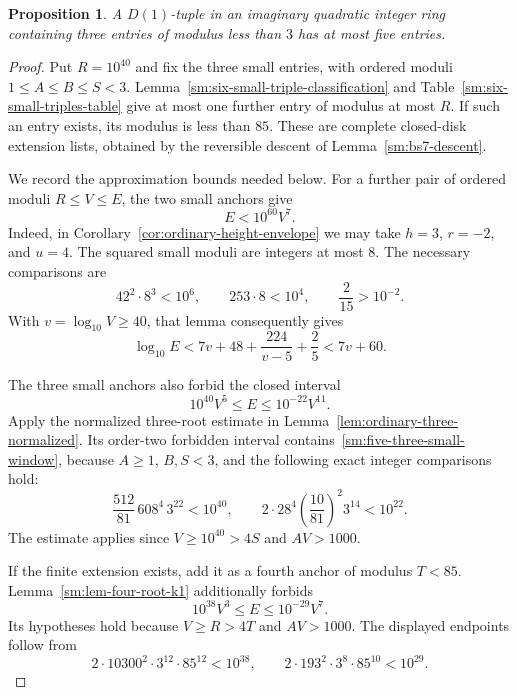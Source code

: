 \documentclass[12pt]{article}
\newtheorem{proposition}[theorem]{Proposition}
\numberwithin{equation}{section}
\begin{document}
\begin{proposition}\label{sm:five-three-small}
A $D(1)$-tuple in an imaginary quadratic integer ring containing
three entries of modulus less than $3$ has at most five entries.
\end{proposition}
\begin{proof}
Put $R=10^{40}$ and fix the three small entries, with ordered
moduli $1\le A\le B\le S<3$.
Lemma~\ref{sm:six-small-triple-classification} and
Table~\ref{sm:six-small-triples-table} give at most one further entry
of modulus at most $R$. If such an entry exists, its modulus is
less than $85$. These are complete closed-disk extension lists,
obtained by the reversible descent of Lemma~\ref{sm:bs7-descent}.

We record the approximation bounds needed below. For a further
pair of ordered moduli $R\le V\le E$, the two small anchors give
\begin{equation}\label{sm:five-small-upper}
 E<10^{60}V^7.
\end{equation}
Indeed, in Corollary~\ref{cor:ordinary-height-envelope} we may take
$h=3$, $r=-2$, and $u=4$. The squared small moduli are integers at most $8$. The necessary comparisons are
\[
 42^2\cdot8^3<10^6,\qquad 253\cdot8<10^4,\qquad
 \frac2{15}>10^{-2}.
\]
With $v=\log_{10}V\ge40$, that lemma consequently gives
\[
 \log_{10}E<7v+48+\frac{224}{v-5}+\frac25<7v+60.
\]

The three small anchors also forbid the closed interval
\begin{equation}\label{sm:five-three-small-window}
 10^{40}V^5\le E\le10^{-22}V^{11}.
\end{equation}
Apply the normalized three-root estimate
in Lemma~\ref{lem:ordinary-three-normalized}. Its order-two forbidden
interval contains~\eqref{sm:five-three-small-window}, because $A\ge1$,
$B,S<3$, and the following exact integer comparisons hold:
\[
 \frac{512}{81}\,608^4\,3^{22}<10^{40},\qquad
 2\cdot28^4\left(\frac{10}{81}\right)^2 3^{14}<10^{22}.
\]
The estimate applies since $V\ge10^{40}>4S$ and $AV>1000$.

If the finite extension exists, add it as a fourth anchor of
modulus $T<85$. Lemma~\ref{sm:lem-four-root-k1} additionally forbids
\begin{equation}\label{sm:five-four-fixed-window}
 10^{38}V^3\le E\le10^{-29}V^7.
\end{equation}
Its hypotheses hold because $V\ge R>4T$ and $AV>1000$.
The displayed endpoints follow from
\[
 2\cdot10300^2\cdot3^{12}\cdot85^{12}<10^{38},\qquad
 2\cdot193^2\cdot3^8\cdot85^{10}<10^{29}.
\]


\end{proof}
\end{document}
